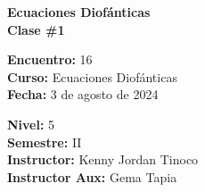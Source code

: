 \begin{center} \textbf
{
    \Large Ecuaciones Diofánticas \\ \vspace{2mm}Clase \#1
}
\end{center}

\begin{multicols}{2}
{
    \textbf{Encuentro:} 16\\
    \textbf{Curso:} Ecuaciones Diofánticas\\
    \textbf{Fecha:} 3 de agosto de 2024\\
    \begin{flushright}
        \textbf{Nivel:} 5\\
        \textbf{Semestre:} II\\
        \textbf{Instructor:} Kenny Jordan Tinoco\\
        \textbf{Instructor Aux:} Gema Tapia
    \end{flushright}
}
\end{multicols}

\thispagestyle{first-page-style}
